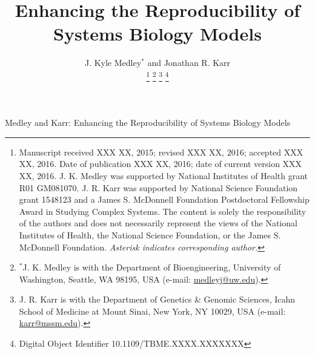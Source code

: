 \documentclass[journal,transmag,twoside]{IEEEtran}
\newcommand{\email}[1]{\href{mailto:#1}{#1}}
\begin{document}
\newcommand{\thetitle}{Enhancing the Reproducibility of Systems Biology Models}
\title{\thetitle}

\author{
    J. Kyle Medley$^*$ and
	Jonathan R. Karr
    
    \thanks{
        Manuscript received XXX XX, 2015; revised XXX XX, 2016; accepted XXX XX, 2016. Date of publication XXX XX, 2016; date of current version XXX XX, 2016.
        J. K. Medley was supported by National Institutes of Health grant R01 GM081070. J. R. Karr was supported by National Science Foundation grant 1548123 and a James S. McDonnell Foundation Postdoctoral Fellowship Award in Studying Complex Systems. The content is solely the responsibility of the authors and does not necessarily represent the views of the National Institutes of Health, the National Science Foundation, or the James S. McDonnell Foundation.
        \textit{Asterisk indicates corresponding author.}
    }
    \thanks{$^*$J. K. Medley is with the Department of Bioengineering, University of Washington, Seattle, WA 98195, USA (e-mail: \email{medleyj@uw.edu}).}
    \thanks{J. R. Karr is with the Department of Genetics \& Genomic Sciences, Icahn School of Medicine at Mount Sinai, New York, NY 10029, USA (e-mail: \email{karr@mssm.edu}).}
    \thanks{Digital Object Identifier 10.1109/TBME.XXXX.XXXXXXX}
}

%
{Medley and Karr: \thetitle}
% 








\maketitle
\end{document}
